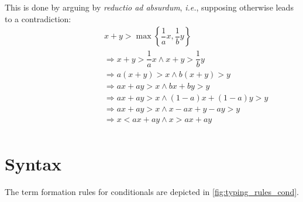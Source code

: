This is done by arguing by \textit{reductio ad absurdum}, \textit{i.e.}, supposing otherwise leads to a contradiction:
\begin{equation} 
\begin{split} 
    \hspace{90pt}&
     x + y  >  \max \left\{   \dfrac{1}{a}x  ,   \dfrac{1}{b} y   \right\} \\
    & \Rightarrow  x + y > \dfrac{1}{a}x  \wedge x + y > \dfrac{1}{b}y \\
    & \Rightarrow  a (x + y) > x  \wedge b (x + y)> y \\
    & \Rightarrow  a x + a y > x  \wedge b x + by > y \\
    & \Rightarrow  a x + a y > x  \wedge (1-a) x + (1-a)y > y\\
    & \Rightarrow  a x + a y > x  \wedge x-ax + y -ay > y\\
    & \Rightarrow  x < a x + a y   \wedge x > a x + a y  \\
\end{split}
\end{equation}



\section{Syntax}

The term formation rules for conditionals are depicted in
\autoref{fig:typing_rules_cond}. 

